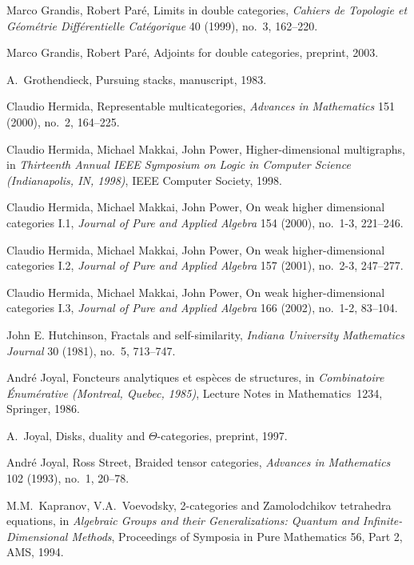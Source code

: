 \begin{thebibliography}{c9999}
Marco Grandis, Robert Par\'e, 
Limits in double categories,
\emph{Cahiers de Topologie et G\'eom\'etrie Diff\'erentielle Cat\'egorique}
40 (1999), no.~3, 162--220.

Marco Grandis, Robert Par\'e, 
Adjoints for double categories, 
preprint, 2003.

A.~Grothendieck, 
Pursuing stacks,
manuscript, 1983.

Claudio Hermida,  
Representable multicategories,
\emph{Advances in Mathematics} 151 (2000), no.~2, 164--225.

Claudio Hermida, Michael Makkai, John Power,
Higher-dimensional multigraphs,
in
\emph{Thirteenth Annual IEEE Symposium on Logic in Computer Science
(Indianapolis, IN, 1998)},
IEEE Computer Society, 1998.

Claudio Hermida, Michael Makkai, John Power,
On weak higher dimensional categories I.1, 
\emph{Journal of Pure and Applied Algebra} 154 (2000), no.~1-3, 221--246.

Claudio Hermida, Michael Makkai, John Power,
On weak higher-dimensional categories I.2, 
\emph{Journal of Pure and Applied Algebra} 157 (2001), no.~2-3, 247--277.

Claudio Hermida, Michael Makkai, John Power,
On weak higher-dimensional categories I.3,
\emph{Journal of Pure and Applied Algebra} 166 (2002), no.~1-2, 83--104.

John E. Hutchinson, 
Fractals and self-similarity,
\emph{Indiana University Mathematics Journal} 30 (1981), no.~5, 713--747.

Andr\'e Joyal,
Foncteurs analytiques et esp\`eces de structures,
in
\emph{Combinatoire \'Enum\'erative (Montreal, Quebec, 1985)},
Lecture Notes in Mathematics~1234,
Springer, 1986.

A.~Joyal,
Disks, duality and $\Theta$-categories,
preprint, 1997.

Andr\'e Joyal, Ross Street,
Braided tensor categories, 
\emph{Advances in Mathematics} 102 (1993), no.~1, 20--78.

M.M.~Kapranov, V.A.~Voevodsky,
2-categories and Zamolodchikov tetrahedra equations,
in 
\emph{Algebraic Groups and their Generalizations: Quantum and
Infinite-Dimensional Methods}, Proceedings of Symposia in Pure Mathematics 56,
Part 2, AMS, 1994.


\end{thebibliography}
